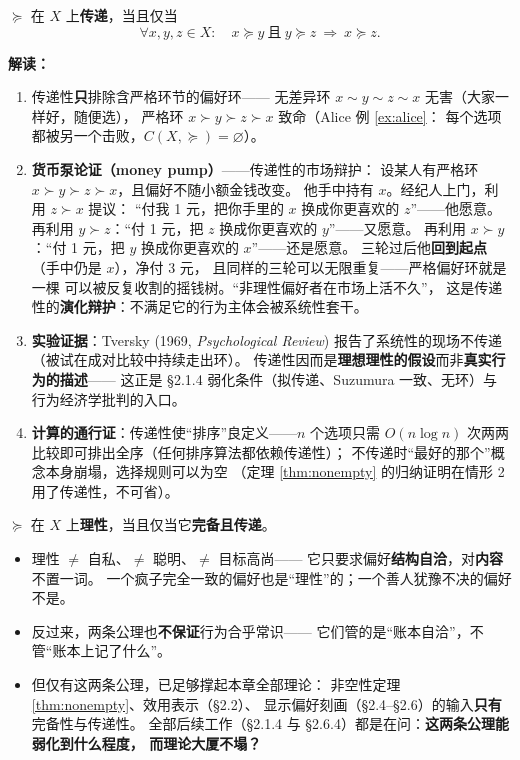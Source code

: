 \begin{definition}\label{def:transitive}
$\succeq$ 在 $X$ 上\textbf{传递}，当且仅当
\[
\forall x,y,z\in X:\quad x\succeq y\ \text{且}\ y\succeq z\ \Rightarrow\ x\succeq z.
\]
\end{definition}

\textbf{解读：}
\begin{enumerate}
  \item 传递性\textbf{只}排除含严格环节的偏好环——
  无差异环 $x\sim y\sim z\sim x$ 无害（大家一样好，随便选），
  严格环 $x\succ y\succ z\succ x$ 致命（Alice 例 \ref{ex:alice}：
  每个选项都被另一个击败，$C(X,\succeq)=\varnothing$）。
  \item \textbf{货币泵论证（money pump）}——传递性的市场辩护：
  设某人有严格环 $x\succ y\succ z\succ x$，且偏好不随小额金钱改变。
  他手中持有 $x$。经纪人上门，利用 $z\succ x$ 提议：
  “付我 1 元，把你手里的 $x$ 换成你更喜欢的 $z$”——他愿意。
  再利用 $y\succ z$：“付 1 元，把 $z$ 换成你更喜欢的 $y$”——又愿意。
  再利用 $x\succ y$：“付 1 元，把 $y$ 换成你更喜欢的 $x$”——还是愿意。
  三轮过后他\textbf{回到起点}（手中仍是 $x$），净付 3 元，
  且同样的三轮可以无限重复——严格偏好环就是一棵
  可以被反复收割的摇钱树。“非理性偏好者在市场上活不久”，
  这是传递性的\textbf{演化辩护}：不满足它的行为主体会被系统性套干。
  \item \textbf{实验证据}：Tversky (1969, \emph{Psychological Review})
  报告了系统性的现场不传递（被试在成对比较中持续走出环）。
  传递性因而是\textbf{理想理性的假设}而非\textbf{真实行为的描述}——
  这正是 §2.1.4 弱化条件（拟传递、Suzumura 一致、无环）与
  行为经济学批判的入口。
  \item \textbf{计算的通行证}：传递性使“排序”良定义——$n$ 个选项只需
  $O(n\log n)$ 次两两比较即可排出全序（任何排序算法都依赖传递性）；
  不传递时“最好的那个”概念本身崩塌，选择规则可以为空
  （定理 \ref{thm:nonempty} 的归纳证明在情形 2 用了传递性，不可省）。
\end{enumerate}

\begin{definition}\label{def:rational}
$\succeq$ 在 $X$ 上\textbf{理性}，当且仅当它\textbf{完备且传递}。
\end{definition}

\begin{remark}
\begin{itemize}
  \item 理性 $\neq$ 自私、$\neq$ 聪明、$\neq$ 目标高尚——
  它只要求偏好\textbf{结构自洽}，对\textbf{内容}不置一词。
  一个疯子完全一致的偏好也是“理性”的；一个善人犹豫不决的偏好不是。
  \item 反过来，两条公理也\textbf{不保证}行为合乎常识——
  它们管的是“账本自洽”，不管“账本上记了什么”。
  \item 但仅有这两条公理，已足够撑起本章全部理论：
  非空性定理 \ref{thm:nonempty}、效用表示（§2.2）、
  显示偏好刻画（§2.4--§2.6）的输入\textbf{只有}完备性与传递性。
  全部后续工作（§2.1.4 与 §2.6.4）都是在问：\textbf{这两条公理能弱化到什么程度，
  而理论大厦不塌？}
\end{itemize}
\end{remark}

